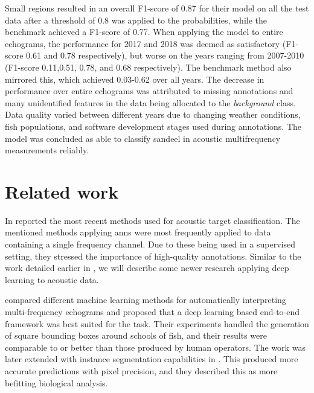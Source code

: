     Small regions resulted in an overall F1-score of 0.87 for their model on all the test data after a threshold of 0.8 was applied to the probabilities, while the benchmark achieved a F1-score of 0.77. When applying the model to entire echograms, the performance for 2017 and 2018 was deemed as satisfactory (F1-score 0.61 and 0.78 respectively), but worse on the years ranging from 2007-2010 (F1-score 0.11,0.51, 0.78, and 0.68 respectively). The benchmark method also mirrored this, which achieved 0.03-0.62 over all years. The decrease in performance over entire echograms was attributed to missing annotations and many unidentified features in the data being allocated to the \textit{background} class. Data quality varied between different years due to changing weather conditions, fish populations, and software development stages used during annotations. The model was concluded as able to classify sandeel in acoustic multifrequency measurements reliably\cite{brautaset2020acoustic}.

\section{Related work} \label{related_work}
In \citeyear{korneliussen2018acoustic} \citet{korneliussen2018acoustic} reported the most recent methods used for acoustic target classification. The mentioned methods applying \gls{ann}s were most frequently applied to data containing a single frequency channel. Due to these being used in a supervised setting, they stressed the importance of high-quality annotations. Similar to the work detailed earlier in \citet{brautaset2020acoustic}, we will describe some newer research applying deep learning to acoustic data.
   
\citet{marques2021detecting} compared different machine learning methods for automatically interpreting multi-frequency echograms and proposed that a deep learning based end-to-end framework was best suited for the task. Their experiments handled the generation of square bounding boxes around schools of fish, and their results were comparable to or better than those produced by human operators. The work was later extended with instance segmentation capabilities in \citeyear{marques2021instance}\cite{marques2021instance}. This produced more accurate predictions with pixel precision, and they described this as more befitting biological analysis.
 
